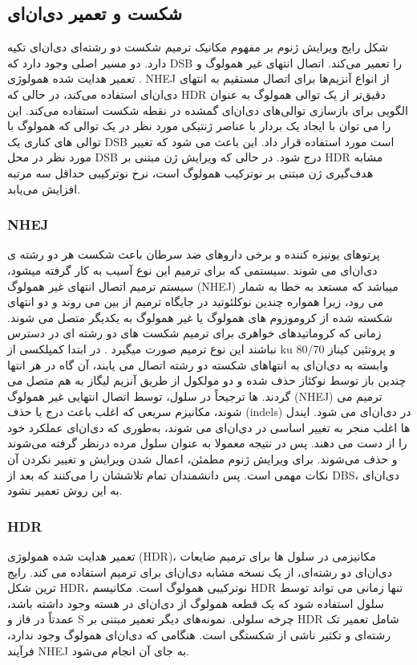 \documentclass[12pt,a4paper,BCOR=.7cm,headsepline,bibliography=totoc]{report}
\begin{document}
\subsection{ شکست و تعمیر دی‌ان‌ای}
شکل رایج ویرایش ژنوم بر مفهوم مکانیک ترمیم شکست دو رشته‌ای دی‌ان‌ای
تکیه دارد. دو مسیر اصلی وجود دارد که DSB را تعمیر می‌کند. اتصال انتهای غیر همولوگ
  و تعمیر هدایت شده همولوژی
   . NHEJ از انواع آنزیم‌ها برای اتصال مستقیم به انتهای دی‌ان‌ای استفاده می‌کند، در حالی که HDR دقیق‌تر از یک توالی همولوگ به عنوان الگویی برای بازسازی توالی‌های دی‌ان‌ای گمشده در نقطه شکست استفاده می‌کند. این را می توان با ایجاد یک بردار با عناصر ژنتیکی مورد نظر در یک توالی که همولوگ با توالی های کناری یک DSB است مورد استفاده قرار داد. این باعث می شود که تغییر مورد نظر در محل DSB درج شود. در حالی که ویرایش ژن مبتنی بر HDR مشابه هدف‌گیری ژن مبتنی بر نوترکیب همولوگ است، نرخ نوترکیبی حداقل سه مرتبه افزایش می‌یابد.
\subsubsection{NHEJ}

پرتوهای یونیزه کننده و برخی داروهای ضد سرطان باعث شکست هر دو رشته ی دی‌ان‌ای می شوند .سیستمی که برای ترمیم این نوع آسیب به کار گرفته میشود، سیستم ترمیم اتصال انتهای غیر همولوگ (NHEJ) میباشد که مستعد به خطا به شمار می رود، زیرا همواره چندین نوکلئوتید در جایگاه ترمیم از بین می روند و دو انتهای شکسته شده از کروموزوم های همولوگ یا غیر همولوگ به یکدیگر متصل می شوند.
زمانی که کروماتیدهای خواهری برای ترمیم شکست های دو رشته ای در دسترس نباشند این نوع ترمیم صورت میگیرد . در ابتدا کمپلکسی از ku 80/70 و پروتئین کیناز وابسته به دی‌ان‌ای به انتهاهای شکسته دو رشته اتصال می یابند، آن گاه در هر انتها چندین باز توسط نوکئاز حذف شده و دو مولکول از طریق آنزیم لیگاز به هم متصل می گردند. 
ها
 ترجیحاً در سلول، توسط اتصال انتهایی غیر همولوگ (NHEJ) ترمیم می شوند، مکانیزم سریعی که اغلب باعث درج یا حذف (indels) در دی‌ان‌ای می شود. ایندل ها اغلب منجر به تغییر اساسی در دی‌ان‌ای می شوند، به‌طوری که دی‌ان‌ای عملکرد خود را از دست می دهند. پس در نتیجه معمولا به عنوان سلول مرده درنظر گرفته می‌شوند و حذف می‌شوند. برای ویرایش ژنوم مطمئن، اعمال شدن ویرایش و تغییر نکردن آن نکات مهمی است. پس دانشمندان تمام تلاششان را می‌کنند که بعد از DBS، دی‌ان‌ای به این روش تعمیر نشود.
\subsubsection{HDR}
 تعمیر هدایت شده همولوژی (HDR)، مکانیزمی در سلول ها برای ترمیم ضایعات دی‌ان‌ای دو رشته‌ای، از یک نسخه مشابه دی‌ان‌ای برای ترمیم استفاده می کند. رایج ترین شکل HDR، نوترکیبی همولوگ است. مکانیسم HDR تنها زمانی می تواند توسط سلول استفاده شود که یک قطعه همولوگ از دی‌ان‌ای در هسته وجود داشته باشد، عمدتاً در فاز
 و S چرخه سلولی. نمونه‌های دیگر تعمیر مبتنی بر HDR شامل تعمیر تک رشته‌ای و تکثیر ناشی از شکستگی است. هنگامی که دی‌ان‌ای همولوگ وجود ندارد، فرآیند NHEJ به جای آن انجام می‌شود.
\end{document}
